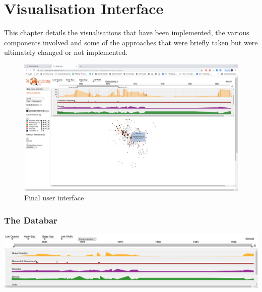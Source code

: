 



\chapter{Visualisation Interface}
This chapter details the visualisations that have been implemented, the various components involved and some of the approaches that were briefly taken but were ultimately changed or not implemented.


\begin{figure}[h!]
  \begin{center}
  \includegraphics[trim={0, 0, 0, 3.5cm}, clip, width=140mm]{./Figures/vistorianNewFull.png}
  \caption{Final user interface}
  \label{fig:vistorianNewFull}
  \end{center}
\end{figure}

\subsection{The Databar}

\begin{center}
\includegraphics[trim={0 0 0 0}, width=140mm]{./Figures/databar.png}
\end{center}

